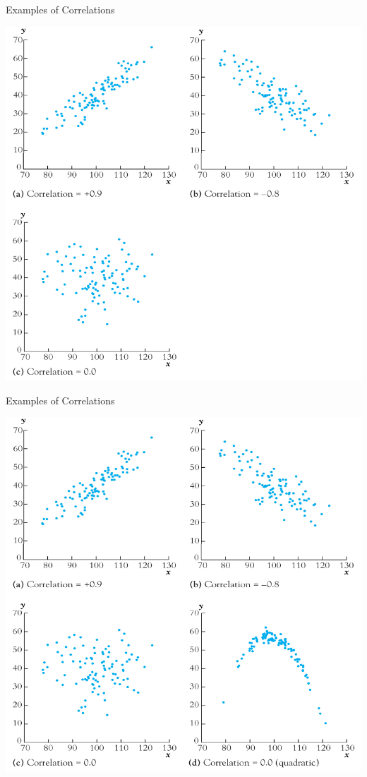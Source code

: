 \documentclass[11pt,english,handout]{beamer}
\begin{document}
\begin{frame}{Examples of Correlations}

\begin{center}
\includegraphics[scale=0.35]{corr3.png} 
\end{center}

\end{frame}

\begin{frame}{Examples of Correlations}

\begin{center}
\includegraphics[scale=0.35]{corr4.png} 
\end{center}

\end{frame}
\end{document}
